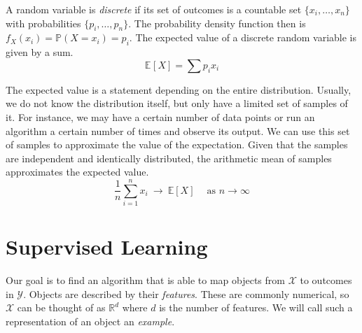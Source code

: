 \documentclass[
    a4paper, %
	fontsize=10pt, %
	twoside=false, %
]{kaobook}
\begin{document}


A random variable is \textit{discrete} if its set of outcomes is a countable set $\{ x_{i}, \dots, x_{n} \}$ with probabilities $\{ p_{i}, \dots, p_{n} \}$. The probability density function then is $f_X(x_i) = \mathbb{P}(X = x_i) = p_i$. The expected value of a discrete random variable is given by a sum.
$$
\mathbb{E}_{}\left[ X \right]  = \sum p_{i} x_{i}
$$

The expected value is a statement depending on the entire distribution. Usually, we do not know the distribution itself, but only have a limited set of samples of it. For instance, we may have a certain number of data points or run an algorithm a certain number of times and observe its output. We can use this set of samples to approximate the value of the expectation. Given that the samples are independent and identically distributed, the arithmetic mean of samples approximates the expected value.
$$
\frac{1}{n} \sum_{i=1}^n x_i ~ \rightarrow ~ \mathbb{E}\left[X\right]  ~ \hspace{1em} \text{as $n \to \infty$}
$$


\section{Supervised Learning}
\label{sec:supervised-learning}

Our goal is to find an algorithm that is able to map objects from $\mathcal{X}$ to outcomes in $\mathcal{Y}$. Objects
are described by their \textit{features}. These are commonly numerical, so $\mathcal{X}$ can be thought of as $\mathbb{R}^d$ where $d$ is the number of features. We will call such a representation of an object an \textit{example}.
\end{document}

